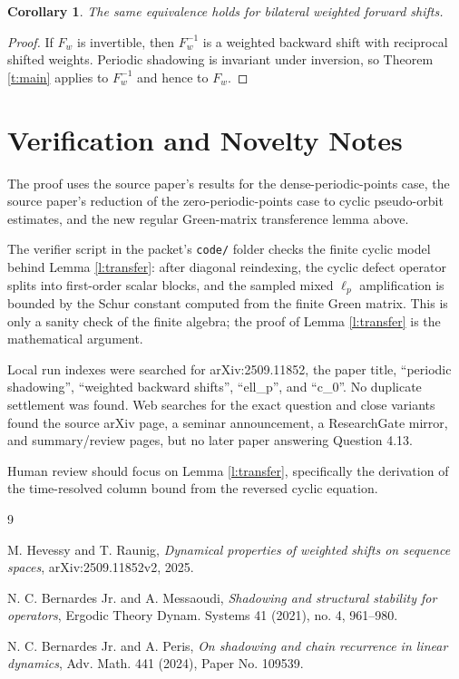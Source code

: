 \documentclass[11pt]{amsart}
\newtheorem{corollary}{Corollary}
\theoremstyle{remark}
\begin{document}
\begin{corollary}
The same equivalence holds for bilateral weighted forward shifts.
\end{corollary}

\begin{proof}
If \(F_w\) is invertible, then \(F_w^{-1}\) is a weighted backward shift with reciprocal shifted weights.  Periodic shadowing is invariant under inversion, so Theorem \ref{t:main} applies to \(F_w^{-1}\) and hence to \(F_w\).
\end{proof}

\section{Verification and Novelty Notes}

The proof uses the source paper's results for the dense-periodic-points case, the source paper's reduction of the zero-periodic-points case to cyclic pseudo-orbit estimates, and the new regular Green-matrix transference lemma above.

The verifier script in the packet's \texttt{code/} folder checks the finite cyclic model behind Lemma \ref{l:transfer}: after diagonal reindexing, the cyclic defect operator splits into first-order scalar blocks, and the sampled mixed \(\ell_p\) amplification is bounded by the Schur constant computed from the finite Green matrix.  This is only a sanity check of the finite algebra; the proof of Lemma \ref{l:transfer} is the mathematical argument.

Local run indexes were searched for arXiv:2509.11852, the paper title, ``periodic shadowing'', ``weighted backward shifts'', ``ell\_p'', and ``c\_0''.  No duplicate settlement was found.  Web searches for the exact question and close variants found the source arXiv page, a seminar announcement, a ResearchGate mirror, and summary/review pages, but no later paper answering Question 4.13.

Human review should focus on Lemma \ref{l:transfer}, specifically the derivation of the time-resolved column bound from the reversed cyclic equation.

\begin{thebibliography}{9}

M. Hevessy and T. Raunig,
\emph{Dynamical properties of weighted shifts on sequence spaces},
arXiv:2509.11852v2, 2025.

N. C. Bernardes Jr. and A. Messaoudi,
\emph{Shadowing and structural stability for operators},
Ergodic Theory Dynam. Systems 41 (2021), no. 4, 961--980.

N. C. Bernardes Jr. and A. Peris,
\emph{On shadowing and chain recurrence in linear dynamics},
Adv. Math. 441 (2024), Paper No. 109539.

\end{thebibliography}
\end{document}
